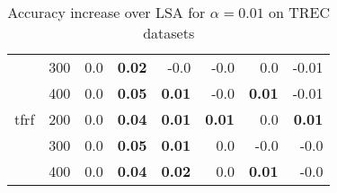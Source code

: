 \begin{table}[h]
\begin{center}
\begin{tabular}{ll|rrrrrr}
   & 300 &       0.0 &  \textbf{0.02} &       -0.0 &      -0.0 &       0.0 &      -0.01 \\
   & 400 &       0.0 &  \textbf{0.05} &  \textbf{0.01} &      -0.0 &  \textbf{0.01} &      -0.01 \\
tfrf & 200 &       0.0 &  \textbf{0.04} &  \textbf{0.01} &  \textbf{0.01} &       0.0 &  \textbf{0.01} \\
   & 300 &       0.0 &  \textbf{0.05} &  \textbf{0.01} &       0.0 &      -0.0 &      -0.0 \\
   & 400 &       0.0 &  \textbf{0.04} &  \textbf{0.02} &       0.0 &  \textbf{0.01} &      -0.0 \\
\bottomrule
\end{tabular}

\caption[Accuracy increase over LSA for $\alpha=0.01$ on TREC datasets]{Accuracy increase over LSA for $\alpha=0.01$ on TREC datasets}
\label{tab:batch:results:trec0.01}
\end{center}
\end{table}


